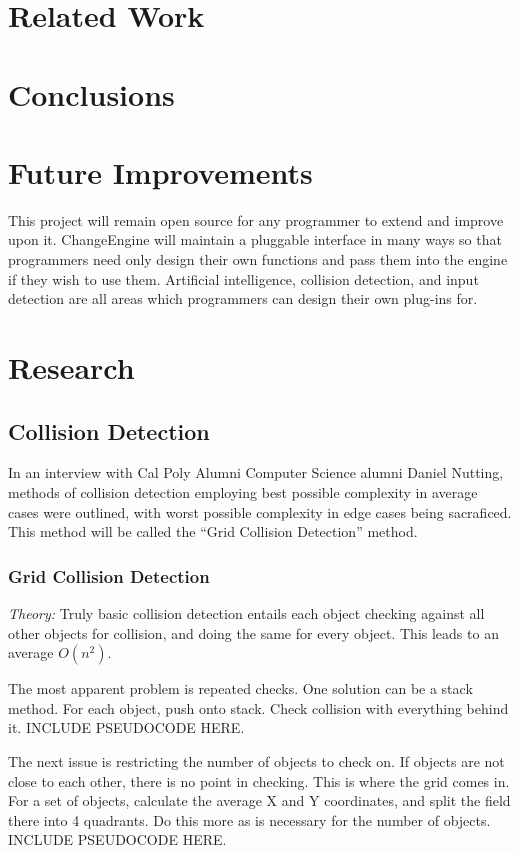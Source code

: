 \documentclass[12pt]{article}
\begin{document}
  \section{Related Work}

  \section{Conclusions}

  \section{Future Improvements}
    This project will remain open source for any programmer to extend and improve upon it. ChangeEngine will maintain a pluggable interface in many ways so that programmers need only design their own functions and pass them into the engine if they wish to use them. Artificial intelligence, collision detection, and input detection are all areas which programmers can design their own plug-ins for.

  \newpage

  \appendix
  \section{Research}

  \subsection{Collision Detection}
    In an interview with Cal Poly Alumni Computer Science alumni Daniel Nutting, methods of collision detection employing best possible complexity in average cases were outlined, with worst possible complexity in edge cases being sacraficed. This method will be called the ``Grid Collision Detection'' method.

    \subsubsection{Grid Collision Detection}
      \emph{Theory: } Truly basic collision detection entails each object checking against all other objects for collision, and doing the same for every object. This leads to an average $O(n^2)$.

      The most apparent problem is repeated checks. One solution can be a stack method. For each object, push onto stack. Check collision with everything behind it. INCLUDE PSEUDOCODE HERE.

      The next issue is restricting the number of objects to check on. If objects are not close to each other, there is no point in checking. This is where the grid comes in. For a set of objects, calculate the average X and Y coordinates, and split the field there into 4 quadrants. Do this more as is necessary for the number of objects. INCLUDE PSEUDOCODE HERE.
\end{document}
